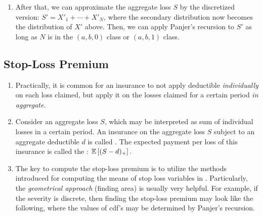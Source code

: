 \begin{enumerate}
\item After that, we can approximate the aggregate loss \(S\) by the
discretized version: \(S'=X'_1+\dotsb+X'_N\), where the secondary
distribution now becomes the distribution of \(X'\) above. Then, we can apply
Panjer's recursion to \(S'\) as long as \(N\) is in the \((a,b,0)\) class or
\((a,b,1)\) class.
\end{enumerate}
\subsection{Stop-Loss Premium}
\begin{enumerate}
\item Practically, it is common for an insurance to not apply deductible
\emph{individually} on each loss claimed, but apply it on the losses claimed
for a certain period \emph{in aggregate}.

\item Consider an aggregate loss \(S\), which may be interpreted as sum of
individual losses in a certain period. An insurance on the aggregate loss \(S\)
subject to an aggregate deductible \(d\) is called . The
expected payment per loss of this insurance is called the : \(\mathbb{E}\left[(S-d)_{+}\right].\)


\item The key  to compute the stop-loss premium is to utilize the
methods introduced for computing the means of stop loss variables in
. Particularly, the \emph{geometrical approach}
(finding area) is usually very helpful. For example, if the severity
is discrete, then finding the stop-loss premium may look like the following,
where the values of cdf's may be determined by Panjer's recursion.


\end{enumerate}

